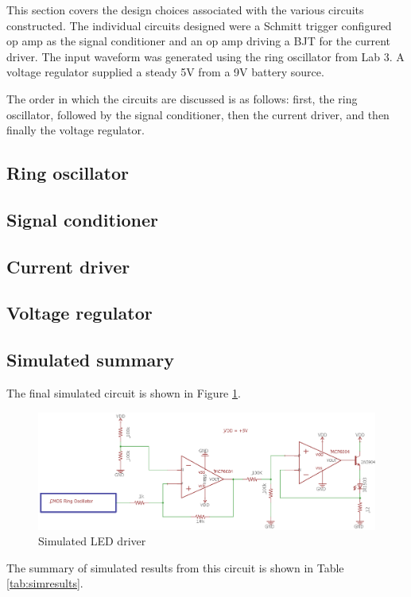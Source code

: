 



This section covers the design choices associated with the various circuits constructed. The individual circuits designed were a Schmitt trigger configured op amp as the signal conditioner and an op amp driving a BJT for the current driver. The input waveform was generated using the ring oscillator from Lab 3. A voltage regulator supplied a steady 5V from a 9V battery source.

The order in which the circuits are discussed is as follows: first, the ring oscillator, followed by the signal conditioner, then the current driver, and then finally the voltage regulator.

\subsection{Ring oscillator}


\subsection{Signal conditioner}


\subsection{Current driver}


\subsection{Voltage regulator}



\subsection{Simulated summary}
The final simulated circuit is shown in Figure \ref{fig:finalschemlab4}.

\begin{figure}[H]
	\centering
	\includegraphics[width=0.7\linewidth]{CircuitDevelopment/FinalschemLab4}
	\caption[Simulated circuit]{Simulated LED driver}
	\label{fig:finalschemlab4}
\end{figure}
The summary of simulated results from this circuit is shown in Table \ref{tab:simresults}.

